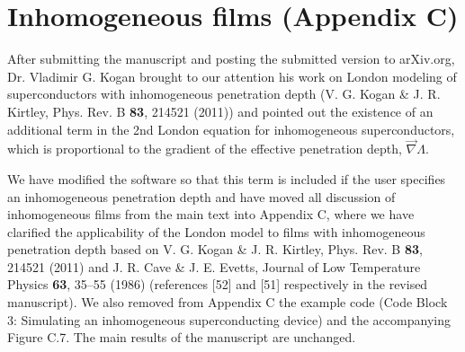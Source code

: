\documentclass{article} %
\begin{document}
\section{Inhomogeneous films (Appendix C)}

After submitting the manuscript and posting the submitted version to arXiv.org, Dr. Vladimir G. Kogan brought to our attention his work on London modeling of superconductors with inhomogeneous penetration depth (V. G. Kogan \& J. R. Kirtley, Phys. Rev. B {\bf 83}, 214521 (2011)) and pointed out the existence of an additional term in the 2nd London equation for inhomogeneous superconductors, which is proportional to the gradient of the effective penetration depth, $\vec{\nabla}\Lambda$.

We have modified the software so that this term is included if the user specifies an inhomogeneous penetration depth and have moved all discussion of inhomogeneous films from the main text into Appendix C, where we have clarified the applicability of the London model to films with inhomogeneous penetration depth based on V. G. Kogan \& J. R. Kirtley, Phys. Rev. B {\bf 83}, 214521 (2011) and J. R. Cave \& J. E. Evetts, Journal of Low Temperature Physics {\bf 63}, 35–55 (1986) (references [52] and [51] respectively in the revised manuscript). We also removed from Appendix C the example code (Code Block 3: Simulating an inhomogeneous superconducting device) and the accompanying Figure C.7. The main results of the manuscript are unchanged.
\end{document}
